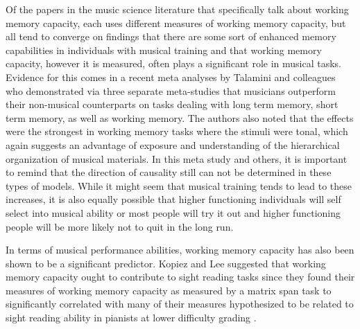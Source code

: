 \documentclass[]{book}
\theoremstyle{definition}
\theoremstyle{definition}
\theoremstyle{definition}
\theoremstyle{remark}
\begin{document}
Of the papers in the music science literature that specifically talk
about working memory capacity, each uses different measures of working
memory capacity, but all tend to converge on findings that there are
some sort of enhanced memory capabilities in individuals with musical
training and that working memory capacity, however it is measured, often
plays a significant role in musical tasks. Evidence for this comes in a
recent meta analyses by Talamini and colleagues
\citep{talaminiMusiciansHaveBetter2017} who demonstrated via three
separate meta-studies that musicians outperform their non-musical
counterparts on tasks dealing with long term memory, short term memory,
as well as working memory. The authors also noted that the effects were
the strongest in working memory tasks where the stimuli were tonal,
which again suggests an advantage of exposure and understanding of the
hierarchical organization of musical materials. In this meta study and
others, it is important to remind that the direction of causality still
can not be determined in these types of models. While it might seem that
musical training tends to lead to these increases, it is also equally
possible that higher functioning individuals will self select into
musical ability or most people will try it out and higher functioning
people will be more likely not to quit in the long run.

In terms of musical performance abilities, working memory capacity has
also been shown to be a significant predictor. Kopiez and Lee suggested
that working memory capacity ought to contribute to sight reading tasks
since they found their measures of working memory capacity as measured
by a matrix span task to significantly correlated with many of their
measures hypothesized to be related to sight reading ability in pianists
at lower difficulty grading
\citep{kopiezDynamicModelSkills2006, kopiezGeneralModelSkills2008}.
\end{document}
